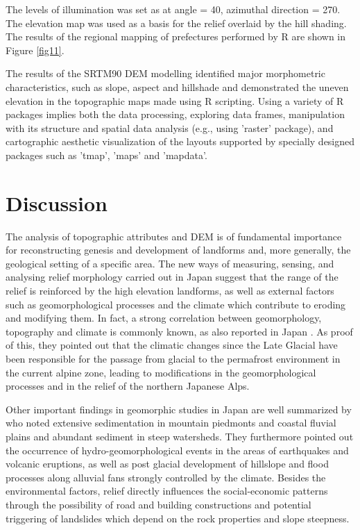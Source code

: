 \documentclass[land,article,submit,pdftex,moreauthors]{Definitions/mdpi}
\begin{document}
The levels of illumination was set as at angle = 40\textdegree, azimuthal direction = 270\textdegree. The elevation map was used as a basis for the relief overlaid by the hill shading. The results of the regional mapping of prefectures performed by R are shown in Figure \ref{fig11}.

The results of the SRTM90 DEM modelling identified major morphometric characteristics, such as slope, aspect and hillshade and demonstrated the uneven elevation in the topographic maps made using R scripting. Using a variety of R packages implies both the data processing, exploring data frames, manipulation with its structure and spatial data analysis (e.g., using 'raster' package), and cartographic aesthetic visualization of the layouts supported by specially designed packages such as 'tmap', 'maps' and 'mapdata'.
		
\section{Discussion}

The analysis of topographic attributes and DEM is of fundamental importance for reconstructing genesis and development of landforms and, more generally, the geological setting of a specific area. The new ways of measuring, sensing, and analysing relief morphology carried out in Japan suggest that the range of the relief is reinforced by the high elevation landforms, as well as external factors such as geomorphological processes and the climate which contribute to eroding and modifying them. In fact, a strong correlation between geomorphology, topography and climate is commonly known, as also reported in Japan \cite{Aoyama2005}. As proof of this, they pointed out that the climatic changes since the Late Glacial have been responsible for the passage from glacial to the permafrost environment in the current alpine zone, leading to modifications in the geomorphological processes and in the relief of the northern Japanese Alps. 
 
Other important findings in geomorphic studies in Japan are well summarized by \cite{OGUCHI20013} who noted extensive sedimentation in mountain piedmonts and coastal fluvial plains and abundant sediment in steep watersheds. They furthermore pointed out the occurrence of hydro-geomorphological events in the areas of earthquakes and volcanic eruptions, as well as post glacial development of hillslope and flood processes along alluvial fans strongly controlled by the climate. Besides the environmental factors, relief directly influences the social-economic patterns through the possibility of road and building constructions and potential triggering of landslides which depend on the rock properties and slope steepness. 
\end{document}

